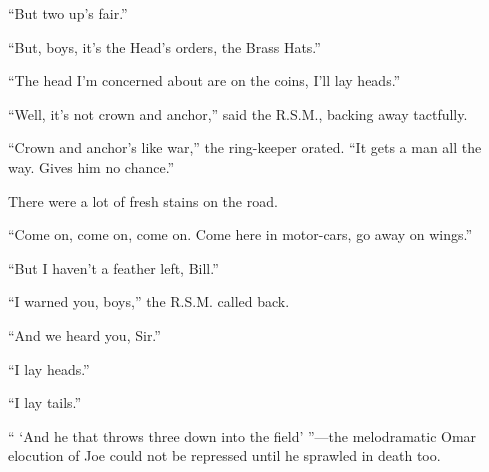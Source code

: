 ``But two up's fair.''

``But, boys, it's the Head's orders, the Brass Hats.''

``The head I'm concerned about are on the coins, I'll lay heads.''

``Well, it's not crown and anchor,'' said the R.S.M., backing away tactfully.

``Crown and anchor's like war,'' the ring-keeper orated. ``It gets a man all the way. Gives him no chance.''

There were a lot of fresh stains on the road.

``Come on, come on, come on. Come here in motor-cars, go away on wings.''

``But I haven't a feather left, Bill.''

``I warned you, boys,'' the R.S.M. called back.

``And we heard you, Sir.''

``I lay heads.''

``I lay tails.''

`` `And he that throws three down into the field' ''---the melodramatic Omar elocution of Joe could not be repressed until he sprawled in death too.